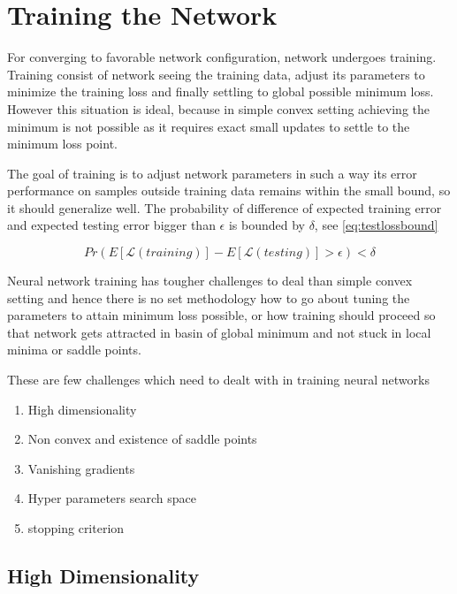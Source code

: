 

\chapter{Training the Network}\label{chap:training}

For converging to favorable network configuration, network undergoes training. Training consist of network seeing the training data, adjust its parameters to minimize the training loss and finally settling to global possible minimum loss. However this situation is ideal, because in simple convex setting achieving the minimum is not possible as it requires exact small updates to settle to the minimum loss point.

The goal of training is to adjust network parameters in such a way its error performance on samples outside training data remains within the small bound, so it should generalize well. The probability of difference of expected training error and expected testing error bigger than $\epsilon$ is bounded by $\delta$, see \ref{eq:testlossbound}

\begin{equation}\label{eq:testlossbound}
Pr(E[\mathcal{L}(training)]-E[\mathcal{L}(testing)] > \epsilon) < \delta 
\end{equation}


Neural network training has tougher challenges to deal than simple convex setting and hence there is no set methodology how to go about tuning the parameters to attain minimum loss possible, or how training should proceed so that network gets attracted in basin of global minimum and not stuck in local minima or saddle points.

These are few challenges which need to dealt with in training neural networks
\begin{enumerate}
	\item High dimensionality
	\item Non convex and existence of saddle points
	\item Vanishing gradients
    \item Hyper parameters search space
    \item stopping criterion
\end{enumerate}

\section{High Dimensionality}

